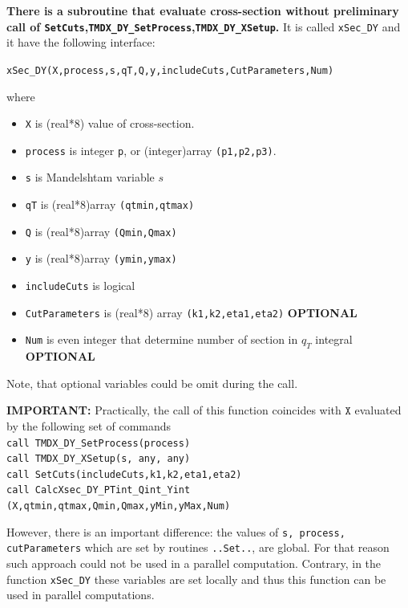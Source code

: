 \documentclass[prd,nofootinbib,eqsecnum,final]{revtex4}
\renewcommand{\(}{\left(}
\renewcommand{\)}{\right)}
\renewcommand{\[}{\left[}
\renewcommand{\]}{\right]}
\newcommand{\red}[1]{{\color[rgb]{1,0,0} #1}}
\newcommand{\blue}[1]{{\color{blue} #1}}
\begin{document}
\begin{tcolorbox}
\textbf{\blue{There is a subroutine that evaluate cross-section without preliminary call of \texttt{SetCuts},\texttt{TMDX\_DY{\_}SetProcess},\texttt{TMDX\_DY{\_}XSetup}}.} It is called \texttt{xSec\_DY} and it have the following interface:

\begin{center}
\texttt{xSec\_DY(X,process,s,qT,Q,y,includeCuts,CutParameters,Num)}
\end{center}

where
\begin{itemize}
\item \texttt{X} is (real*8) value of cross-section.
\item \texttt{process} is integer \texttt{p}, or (integer)array \texttt{(p1,p2,p3)}.
\item \texttt{s} is Mandelshtam variable $s$
\item \texttt{qT} is (real*8)array \texttt{(qtmin,qtmax)}
\item \texttt{Q} is (real*8)array \texttt{(Qmin,Qmax)}
\item \texttt{y} is (real*8)array \texttt{(ymin,ymax)}
\item \texttt{includeCuts} is logical
\item \texttt{CutParameters} is (real*8) array \texttt{(k1,k2,eta1,eta2)} \textbf{OPTIONAL}
\item \texttt{Num} is even integer that determine number of section in $q_T$ integral \textbf{OPTIONAL}
\end{itemize}
Note, that optional variables could be omit during the call. 
\end{tcolorbox}
\textbf{IMPORTANT: } Practically, the call of this function coincides with $\texttt{X}$ evaluated by the following set of commands
\\
\texttt{call TMDX\_DY{\_}SetProcess(process)}
\\
\texttt{call TMDX\_DY{\_}XSetup(s,\red{any},\red{any})}
\\
\texttt{call SetCuts(includeCuts,k1,k2,eta1,eta2)}
\\
\texttt{call CalcXsec\_DY{\_}PTint{\_}Qint{\_}Yint} \texttt{(X,qtmin,qtmax,Qmin,Qmax,yMin,yMax,Num)}

However, there is an important difference: the values of \texttt{s, process, cutParameters} which are set by routines \texttt{..Set..}, are global. For that reason such approach could not be used in a parallel computation. Contrary, in the function \texttt{xSec\_DY} these variables are set locally and thus this function can be used in parallel computations.
\end{document}
